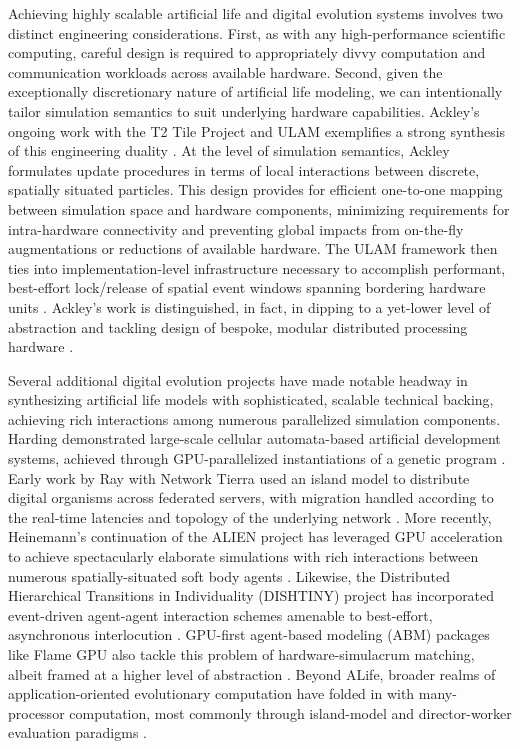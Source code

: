 Achieving highly scalable artificial life and digital evolution systems involves two distinct engineering considerations.
First, as with any high-performance scientific computing, careful design is required to appropriately divvy computation and communication workloads across available hardware.
Second, given the exceptionally discretionary nature of artificial life modeling, we can intentionally tailor simulation semantics to suit underlying hardware capabilities.
Ackley's ongoing work with the T2 Tile Project and ULAM exemplifies a strong synthesis of this engineering duality \citep{ackley2016ulam}.
At the level of simulation semantics, Ackley formulates update procedures in terms of local interactions between discrete, spatially situated particles.
This design provides for efficient one-to-one mapping between simulation space and hardware components, minimizing requirements for intra-hardware connectivity and preventing global impacts from on-the-fly augmentations or reductions of available hardware.
The ULAM framework then ties into implementation-level infrastructure necessary to accomplish performant, best-effort lock/release of spatial event windows spanning bordering hardware units \citep{ackley2013movable}.
Ackley's work is distinguished, in fact, in dipping to a yet-lower level of abstraction and tackling design of bespoke, modular distributed processing hardware \citep{ackley2011homeostatic,ackley2023robust,livingcomputationSFBSanta}.

Several additional digital evolution projects have made notable headway in synthesizing artificial life models with sophisticated, scalable technical backing, achieving rich interactions among numerous parallelized simulation components.
Harding demonstrated large-scale cellular automata-based artificial development systems, achieved through GPU-parallelized instantiations of a genetic program  \citep{harding2007fast_ieee}.
Early work by Ray with Network Tierra used an island model to distribute digital organisms across federated servers, with migration handled according to the real-time latencies and topology of the underlying network \citep{ray1995proposal}.
More recently, Heinemann's continuation of the ALIEN project has leveraged GPU acceleration to achieve spectacularly elaborate simulations with rich interactions between numerous spatially-situated soft body agents \citep{heinemann2008artificial}.
Likewise, the Distributed Hierarchical Transitions in Individuality (DISHTINY) project has incorporated event-driven agent-agent interaction schemes amenable to best-effort, asynchronous interlocution \citep{moreno2022exploring,moreno2021conduit}.
GPU-first agent-based modeling (ABM) packages like Flame GPU also tackle this problem of hardware-simulacrum matching, albeit framed at a higher level of abstraction \citep{richmond2010high}.
Beyond ALife, broader realms of application-oriented evolutionary computation have folded in with many-processor computation, most commonly through island-model and director-worker evaluation paradigms \citep{abdelhafez2019performance,cantu2001master}.

